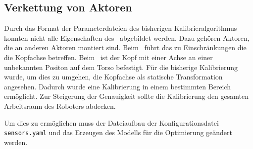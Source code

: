 \subsection{Verkettung von Aktoren}
\label{sub:Verkettung von Aktoren}

Durch das Format der Parameterdateien des bisherigen Kalibrieralgorithmus konnten
nicht alle Eigenschaften des \cob\ abgebildet werden. Dazu gehören Aktoren, die
an anderen Aktoren montiert sind. Beim \cob\ führt das zu Einschränkungen die 
die Kopfachse betreffen. Beim \cob\ ist der Kopf mit einer Achse an einer 
unbekannten Positon auf dem Torso befestigt. Für die bisherige Kalibrierung wurde,
um dies zu umgehen, die Kopfachse als statische Transformation angesehen. Dadurch
wurde eine Kalibrierung in einem bestimmten Bereich ermöglicht. Zur Steigerung
der Genauigkeit sollte die Kalibrierung den gesamten Arbeitsraum des Roboters
abdecken. 

Um dies zu ermöglichen muss der Dateiaufbau der Konfigurationsdatei 
\texttt{sensors.yaml} und das Erzeugen des Modells für die Optimierung geändert
werden.
